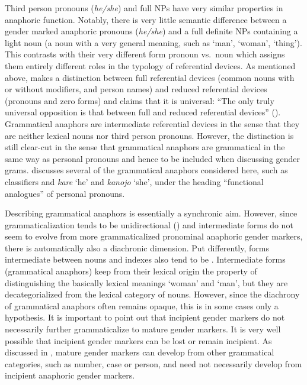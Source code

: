 \documentclass[output=collectionpaper]{langsci/langscibook}
\begin{document}
Third person pronouns (\textit{he/she}) and full NPs have very similar properties in anaphoric function. Notably, there is very little semantic difference between a gender marked anaphoric pronouns (\textit{he/she}) and a full definite NPs containing a light noun (a noun with a very general meaning, such as ‘man’, ‘woman’, ‘thing’). This contrasts with their very different form \textendash{} pronoun vs.\ noun \textendash{} which assigns them entirely different roles in the typology of referential devices. As mentioned above, \citet{Kibrik2011} makes a distinction between full referential devices (common nouns with or without modifiers, and person names) and reduced referential devices (pronouns and zero forms) and claims that it is universal: “The only truly universal opposition is that between full and reduced referential devices” (\citealt[42]{Kibrik2011}). Grammatical anaphors are intermediate referential devices in the sense that they are neither lexical nouns nor third person pronouns. However, the distinction is still clear-cut in the sense that grammatical anaphors are grammatical in the same way as personal pronouns and hence to be included when discussing gender grams. \citet[123--136]{Kibrik2011} discusses several of the grammatical anaphors considered here, such as  classifiers and  \textit{kare} ‘he’ and \textit{kanojo} ‘she’, under the heading “functional analogues” of personal pronouns.

Describing grammatical anaphors is essentially a synchronic aim. However, since grammaticalization tends to be unidirectional (\citealt{Haspelmath1999a}) and intermediate forms do not seem to evolve from more grammaticalized pronominal anaphoric gender markers, there is automatically also a diachronic dimension. Put differently, forms intermediate between nouns and indexes also tend to be . Intermediate forms (grammatical anaphors) keep from their lexical origin the property of distinguishing the basically lexical meanings ‘woman’ and ‘man’, but they are decategorialized from the lexical category of nouns. However, since the diachrony of grammatical anaphors often remains opaque, this is in some cases only a hypothesis. It is important to point out that incipient gender markers do not necessarily further grammaticalize to mature gender markers. It is very well possible that incipient gender markers can be lost or remain incipient. As discussed in , mature gender markers can develop from other grammatical categories, such as number, case or person, and need not necessarily develop from incipient anaphoric gender markers.
\end{document}
